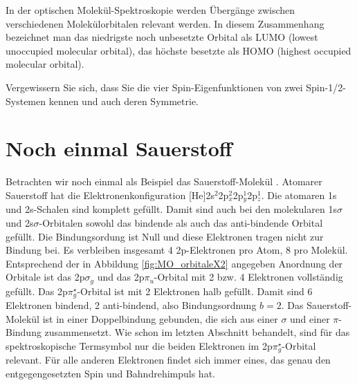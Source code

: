 In der optischen Molekül-Spektroskopie werden Übergänge zwischen verschiedenen Molekülorbitalen relevant werden. In diesem Zusammenhang bezeichnet man das niedrigste noch unbesetzte Orbital als LUMO (lowest unoccupied molecular orbital), das höchste besetzte als HOMO (highest occupied molecular orbital).

\begin{questions} 
\item Vergewissern Sie sich, dass Sie die vier Spin-Eigenfunktionen von zwei Spin-1/2-Systemen kennen und auch deren Symmetrie.

\end{questions}


\section{Noch einmal Sauerstoff}

Betrachten wir noch einmal als Beispiel das Sauerstoff-Molekül .
Atomarer Sauerstoff hat die Elektronenkonfiguration [He]2s$^2$2p$_x^2$2p$_y^1$2p$_z^1$. Die atomaren 1s und 2s-Schalen sind komplett gefüllt. Damit sind auch bei den  molekularen 1s$\sigma$ und 2s$\sigma$-Orbitalen sowohl das bindende als auch das anti-bindende Orbital gefüllt. Die Bindungsordung ist Null und diese Elektronen tragen nicht zur Bindung bei. Es verbleiben 
insgesamt 4 2p-Elektronen pro Atom, 8 pro Molekül. Entsprechend der in Abbildung
\ref{fig:MO_orbitaleX2} angegeben Anordnung der Orbitale ist das 2p$\sigma_g$ und das 2p$\pi_u$-Orbital mit 2 bzw. 4 Elektronen vollständig gefüllt. Das 2p$\pi_g^\star$-Orbital ist mit 2 Elektronen halb gefüllt. Damit sind 6 Elektronen bindend, 2 anti-bindend, also Bindungsordnung $b=2$. Das Sauerstoff-Molekül  ist in einer Doppelbindung gebunden, die sich aus einer $\sigma$ und einer $\pi$-Bindung zusammensetzt. Wie schon im letzten Abschnitt behandelt, sind für das spektroskopische Termsymbol nur die beiden Elektronen im 2p$\pi_g^\star$-Orbital relevant. Für alle anderen Elektronen findet sich immer eines, das genau den entgegengesetzten Spin und Bahndrehimpuls hat.


